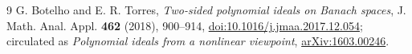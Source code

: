 \documentclass[11pt]{article}
\begin{document}
\begin{thebibliography}{9}
G. Botelho and E. R. Torres,
\emph{Two-sided polynomial ideals on Banach spaces},
J. Math. Anal. Appl. \textbf{462} (2018), 900--914,
\href{https://doi.org/10.1016/j.jmaa.2017.12.054}{doi:10.1016/j.jmaa.2017.12.054};
circulated as \emph{Polynomial ideals from a nonlinear viewpoint},
\href{https://arxiv.org/abs/1603.00246}{arXiv:1603.00246}.
\end{thebibliography}
\end{document}
